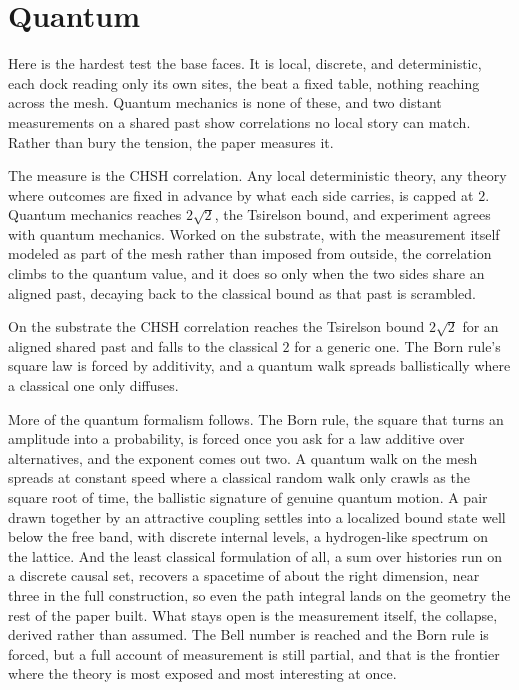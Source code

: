 \section{Quantum}

Here is the hardest test the base faces. It is local, discrete, and deterministic, each dock reading only its own sites, the beat a fixed table, nothing reaching across the mesh. Quantum mechanics is none of these, and two distant measurements on a shared past show correlations no local story can match. Rather than bury the tension, the paper measures it.

The measure is the CHSH correlation. Any local deterministic theory, any theory where outcomes are fixed in advance by what each side carries, is capped at $2$. Quantum mechanics reaches $2\sqrt 2$, the Tsirelson bound, and experiment agrees with quantum mechanics. Worked on the substrate, with the measurement itself modeled as part of the mesh rather than imposed from outside, the correlation climbs to the quantum value, and it does so only when the two sides share an aligned past, decaying back to the classical bound as that past is scrambled.

\begin{result}
On the substrate the CHSH correlation reaches the Tsirelson bound $2\sqrt 2$ for an aligned shared past and falls to the classical $2$ for a generic one. The Born rule's square law is forced by additivity, and a quantum walk spreads ballistically where a classical one only diffuses. \cite{pollard2026vibetest}
\end{result}

More of the quantum formalism follows. The Born rule, the square that turns an amplitude into a probability, is forced once you ask for a law additive over alternatives, and the exponent comes out two. A quantum walk on the mesh spreads at constant speed where a classical random walk only crawls as the square root of time, the ballistic signature of genuine quantum motion. A pair drawn together by an attractive coupling settles into a localized bound state well below the free band, with discrete internal levels, a hydrogen-like spectrum on the lattice. And the least classical formulation of all, a sum over histories run on a discrete causal set, recovers a spacetime of about the right dimension, near three in the full construction, so even the path integral lands on the geometry the rest of the paper built. What stays open is the measurement itself, the collapse, derived rather than assumed. The Bell number is reached and the Born rule is forced, but a full account of measurement is still partial, and that is the frontier where the theory is most exposed and most interesting at once.


